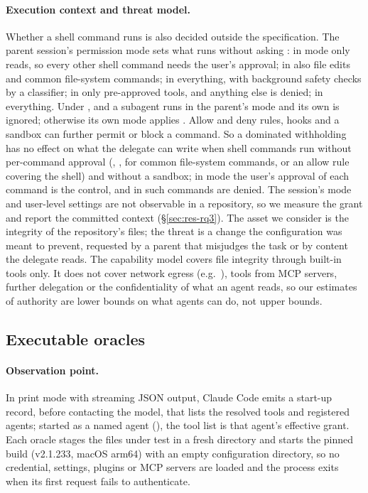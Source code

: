 \paragraph{Execution context and threat model.} Whether a shell command runs is also decided outside the
specification. The parent session's permission mode sets what runs without asking \citep{AnthropicPermissionModesDoc}:
in  mode only reads, so every other shell command needs the user's approval; in  also
file edits and common file-system commands; in  everything, with background safety checks by a classifier;
in  only pre-approved tools, and anything else is denied; in  everything. Under
,  and  a subagent runs in the parent's mode and its own
 is ignored; otherwise its own mode applies \citep{AnthropicSubagentsDoc}. Allow and deny rules,
hooks and a sandbox can further permit or block a command. So a dominated withholding has no effect on what the
delegate can write when shell commands run without per-command approval (, ,
 for common file-system commands, or an allow rule covering the shell) and without a sandbox; in
 mode the user's approval of each command is the control, and in  such commands are
denied. The session's mode and user-level settings are not observable in a repository, so we measure the grant and
report the committed context (\S\ref{sec:res-rq3}). The asset we consider is the integrity of the
repository's files; the threat is a change the configuration was meant to prevent, requested by a parent that
misjudges the task or by content the delegate reads. The capability model covers file integrity through
built-in tools only. It does not cover network egress (e.g.\ ), tools from MCP servers, further
delegation or the confidentiality of what an agent reads, so our estimates of authority are lower bounds on what
agents can do, not upper bounds.

\subsection{Executable oracles}
\label{sec:oracles}

\paragraph{Observation point.} In print mode with streaming JSON output, Claude Code emits a start-up record, before
contacting the model, that lists the resolved tools and registered agents; started as a named agent (),
the tool list is that agent's effective grant. Each oracle stages the files under test in a fresh directory and starts
the pinned build (v2.1.233, macOS arm64) with an empty configuration directory, so no credential, settings, plugins or
MCP servers are loaded and the process exits when its first request fails to authenticate.

